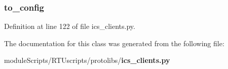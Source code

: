 \subsubsection[{to\+\_\+config}]{\setlength{\rightskip}{0pt plus 5cm}to\+\_\+config}\label{classprotolibs_1_1ics__clients_1_1_modbus_client_abdc59098430de2e716528978c382dc1c}


Definition at line 122 of file ics\+\_\+clients.\+py.



The documentation for this class was generated from the following file\+:\begin{DoxyCompactItemize}
\item 
module\+Scripts/\+R\+T\+Uscripts/protolibs/{\bf ics\+\_\+clients.\+py}\end{DoxyCompactItemize}
